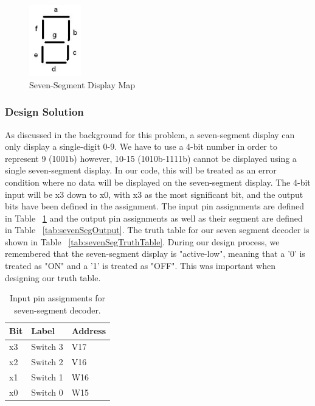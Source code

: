 \documentclass[11pt]{article}
\begin{document}
\begin{figure}[h]
\begin{center}
\includegraphics[width=0.2\textwidth]{report-images/img1.png}
\caption{Seven-Segment Display Map}
\label{fig:sevenSegMap}
\end{center}
\end{figure}

\subsubsection{Design Solution}
As discussed in the background for this problem, a seven-segment display can only display a single-digit 0-9. We have to use a 4-bit number in order to represent 9 (1001b) however, 10-15 (1010b-1111b) cannot be displayed using a single seven-segment display. In our code, this will be treated as an error condition where no data will be displayed on the seven-segment display. The 4-bit input will be x3 down to x0, with x3 as the most significant bit, and the output bits have been defined in the assignment. The input pin assignments are defined in Table ~\ref{tab:sevenSegInput} and the output pin assignments as well as their segment are defined in Table ~\ref{tab:sevenSegOutput}. The truth table for our seven segment decoder is shown in Table ~\ref{tab:sevenSegTruthTable}. During our design process, we remembered that the seven-segment display is "active-low", meaning that a '0' is treated as "ON" and a '1' is treated as "OFF". This was important when designing our truth table.

\begin{table}[h]
\begin{center}
	\begin{tabular}{| l | l | l |}
		\hline
		Bit & Label & Address \\ \hline
		x3 & Switch 3 & V17 \\ \hline
		x2 & Switch 2 & V16 \\ \hline
		x1 & Switch 1 & W16 \\ \hline
		x0 & Switch 0 & W15 \\ \hline
	\end{tabular}
	\caption{\label{tab:table-name}Input pin assignments for seven-segment decoder.}
	\label{tab:sevenSegInput}
\end{center}
\end{table}
\end{document}
